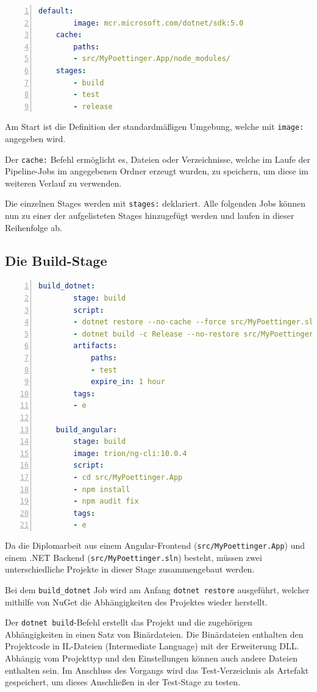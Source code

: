 \begin{lstlisting}[caption={Erste Zeilen der gitlab-ci.yml Datei},captionpos=b, numbers=left, backgroundcolor=\color{black!10}, language=yaml]
	default:
		image: mcr.microsoft.com/dotnet/sdk:5.0
	cache:
		paths:
		- src/MyPoettinger.App/node_modules/
	stages:
		- build
		- test
		- release
\end{lstlisting}

Am Start ist die Definition der standardmäßigen Umgebung, welche mit \texttt{image:} angegeben wird. 

Der \texttt{cache:} Befehl ermöglicht es, Dateien oder Verzeichnisse, welche im Laufe der Pipeline-Jobs im angegebenen Ordner erzeugt wurden, zu speichern, um diese im weiteren Verlauf zu verwenden.

Die einzelnen Stages werden mit \texttt{stages:} deklariert. Alle folgenden Jobs können nun zu einer der aufgelisteten Stages hinzugefügt werden und laufen in dieser Reihenfolge ab.

\newpage

\subsection{Die Build-Stage}\label{sssec:lblBuildStage}

\begin{lstlisting}[caption={Die Build-Stage der gitlab-ci.yml Datei},captionpos=b, numbers=left, backgroundcolor=\color{black!10},
language=yaml]
	build_dotnet:
		stage: build
		script:
		- dotnet restore --no-cache --force src/MyPoettinger.sln
		- dotnet build -c Release --no-restore src/MyPoettinger.sln
  		artifacts:
			paths:
			- test
			expire_in: 1 hour
		tags:
		- e
	
	build_angular:
		stage: build
		image: trion/ng-cli:10.0.4
		script: 
		- cd src/MyPoettinger.App
		- npm install
		- npm audit fix
		tags:
		- e
\end{lstlisting}

Da die Diplomarbeit aus einem Angular-Frontend (\texttt{src/MyPoettinger.App}) und einem .NET Backend (\texttt{src/MyPoettinger.sln}) besteht, müssen zwei unterschiedliche Projekte in dieser Stage zusammengebaut werden. 

Bei dem \texttt{build\_dotnet} Job wird am Anfang \texttt{dotnet restore} ausgeführt, welcher mithilfe von NuGet die Abhängigkeiten des Projektes wieder herstellt. 

Der \texttt{dotnet build}-Befehl erstellt das Projekt und die zugehörigen Abhängigkeiten in einen Satz von Binärdateien. Die Binärdateien enthalten den Projektcode in IL-Dateien (Intermediate Language) mit der Erweiterung DLL. Abhängig vom Projekttyp und den Einstellungen können auch andere Dateien enthalten sein.\cite{dotnetBuildDesc} Im Anschluss des Vorgangs wird das Test-Verzeichnis als Artefakt gespeichert, um dieses Anschließen in der Test-Stage zu testen.

